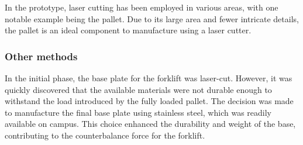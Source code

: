 \documentclass[../report.tex]{subfiles}
\begin{document}
    In the prototype, laser cutting has been employed in various areas, with
    one notable example being the pallet. Due to its large area and fewer
    intricate details, the pallet is an ideal component to manufacture using a
    laser cutter.

\subsubsection{Other methods}
    In the initial phase, the base plate for the forklift was laser-cut.
    However, it was quickly discovered that the available materials were not
    durable enough to withstand the load introduced by the fully loaded pallet.
    The decision was made to manufacture the final base plate using stainless steel,
    which was readily available on campus. This choice enhanced the durability
    and weight of the base, contributing to the counterbalance force for the
    forklift.
\end{document}
